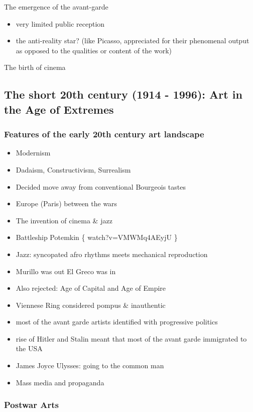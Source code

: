 \documentclass[11pt]{article}
\begin{document}
The emergence of the avant-garde 
\begin{itemize}
\item very limited public reception
\item the anti-reality star? (like Picasso, appreciated for their
phenomenal output as opposed to the qualities or content of the work)
\end{itemize}

The birth of cinema


\subsection{The short 20th century (1914 - 1996): Art in the Age of Extremes}
\label{sec:org60f08eb}
\subsubsection{Features of the early 20th century art landscape}
\label{sec:org697e666}

\begin{itemize}
\item Modernism
\item Dadaism, Constructivism, Surrealism
\item Decided move away from conventional Bourgeois tastes
\item Europe (Paris) between the wars
\item The invention of cinema \& jazz
\item Battleship Potemkin \{ watch?v=VMWMq4AEyjU \}
\item Jazz: syncopated afro rhythms meets mechanical reproduction
\item Murillo was out El Greco was in
\item Also rejected: Age of Capital and Age of Empire
\item Viennese Ring considered pompus \& inauthentic
\item most of the avant garde artists identified with progressive politics
\item rise of Hitler and Stalin meant that most of the avant garde immigrated to the USA
\item James Joyce Ulysses: going to the common man
\item Mass media and propaganda
\end{itemize}

\subsubsection{Postwar Arts}
\label{sec:orga7a6aae}
\end{document}
